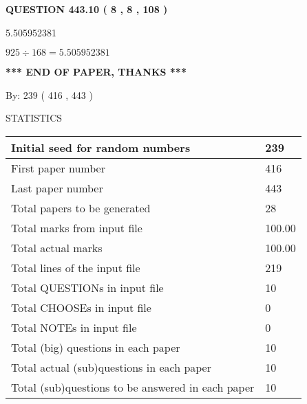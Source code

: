 \documentclass{ctexart}
\begin{document}
\vspace{0.2in}
  
{\textbf{\Large{QUESTION
443.10 
 ( 8 , 8 , 108 )
}}}
  
  
 
 
\noindent{}

5.505952381
 
 
 
 
\noindent{}

$ %
925 \div  %
168=   %
5.505952381$
 
 
   
   
 \vspace{0.2in}
 
   
   
   
   
\vspace{1.0in} 
{\textbf{\large{ *** END OF PAPER, THANKS *** }}} 
   
   
\hspace{1.0in} By: 
 239 ( 416 ,  443 )
   
   
   
\vspace{0.2in}
\vspace{0.2in}
   
   
 \newpage
\setcounter{page}{1} 
   
   
 {\LARGE{STATISTICS}}
   
\vspace{0.2in}
   
 \begin{tabular}{|l|l|}
 \hline
 Initial seed for random numbers & 239  \\
\hline
 First paper number & 416  \\
\hline
 Last  paper number & 443  \\
\hline
 Total papers to be generated & 28  \\
\hline
Total marks from input file & 100.00 \\
\hline
Total actual marks & 100.00 \\
\hline
 Total lines of the input file & 219  \\
 \hline
 Total QUESTIONs in input file & 10  \\
\hline
 Total CHOOSEs in input file & 0  \\
\hline
 Total NOTEs in input file & 0  \\
\hline
 Total (big) questions in each paper & 10  \\
\hline
 Total actual (sub)questions in each paper & 10  \\
\hline
 Total (sub)questions to be answered in each paper & 10  \\
\hline
 \end{tabular}
   
\end{document}
